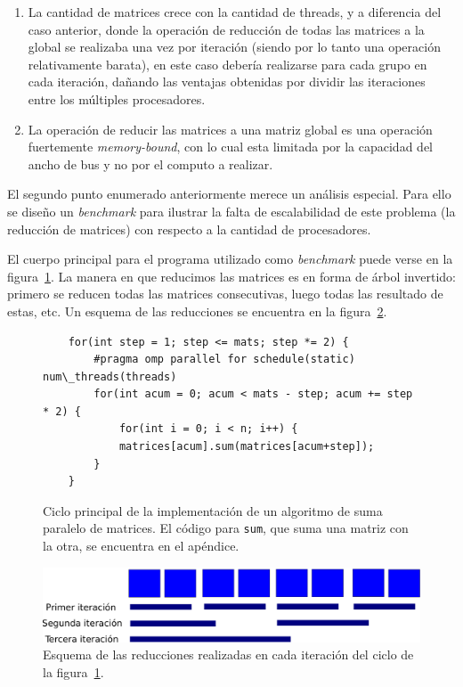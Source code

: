 \begin{enumerate}
    \item La cantidad de matrices crece con la cantidad de threads, y a diferencia
    del caso anterior, donde la operaci\'on de reducci\'on de todas las matrices
    a la global se realizaba una vez por iteraci\'on (siendo por lo tanto
    una operaci\'on relativamente barata), en este caso deber\'ia realizarse para
    cada grupo en cada iteraci\'on, da\~nando las ventajas obtenidas por dividir
    las iteraciones entre los m\'ultiples procesadores.
    \item La operaci\'on de reducir las matrices a una matriz global es una
    operaci\'on fuertemente \textit{memory-bound}, con lo cual esta limitada por
    la capacidad del ancho de bus y no por el computo a realizar.
\end{enumerate}

El segundo punto enumerado anteriormente merece un an\'alisis especial. Para ello
se dise\~no un \textit{benchmark} para ilustrar la falta
de escalabilidad de este problema (la reducci\'on de matrices) con respecto
a la cantidad de procesadores.

El cuerpo principal para el programa utilizado como \textit{benchmark} puede
verse en la figura~\ref{code:sum-matrix-bench-code}. La manera en que reducimos
las matrices es en forma de \'arbol invertido: primero se reducen todas las
matrices consecutivas, luego todas las resultado de estas, etc. Un esquema de
las reducciones se encuentra en la figura~\ref{fig:sum-matrix-bench-reduce}.

\begin{figure}[htbp]
    \begin{lstlisting}
    for(int step = 1; step <= mats; step *= 2) {
        #pragma omp parallel for schedule(static) num\_threads(threads)
        for(int acum = 0; acum < mats - step; acum += step * 2) {
            for(int i = 0; i < n; i++) {
            matrices[acum].sum(matrices[acum+step]);
        }
    }
    \end{lstlisting}
    \caption{Ciclo principal de la implementaci\'on de un algoritmo de suma paralelo de matrices.
    El c\'odigo para \texttt{sum}, que suma una matriz con la otra, se encuentra en el ap\'endice.}
    \label{code:sum-matrix-bench-code}
\end{figure}


\begin{figure}[htbp]
   \centering
   \includegraphics[width=\plotwidth]{images/reductions.png}
   \caption{Esquema de las reducciones realizadas en cada iteraci\'on del ciclo de la
   figura~\ref{code:sum-matrix-bench-code}.}
   \label{fig:sum-matrix-bench-reduce}
\end{figure}

